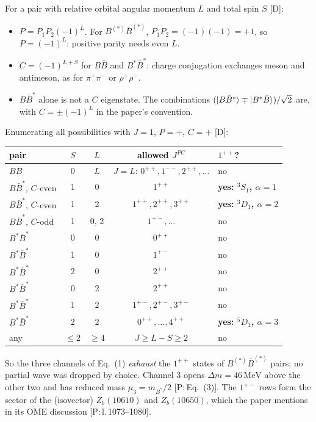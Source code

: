 \documentclass[11pt,a4paper]{article}
\newcommand{\tagP}[1]{\textcolor{blue!65!black}{\textsf{\small[P:\,#1]}}}
\newcommand{\tagD}{\textcolor{orange!85!black}{\textsf{\small[D]}}}
\newcommand{\MeV}{\,\mathrm{MeV}}
\begin{document}
For a pair with relative orbital angular momentum $L$ and total spin $S$ \tagD:
\begin{itemize}
\item $P=P_1P_2(-1)^L$. For $B^{(*)}\bar B^{(*)}$, $P_1P_2=(-1)(-1)=+1$, so $P=(-1)^L$: positive parity needs even $L$.
\item $C=(-1)^{L+S}$ for $B\bar B$ and $B^*\bar B^*$: charge conjugation exchanges meson and antimeson, as for $\pi^+\pi^-$ or $\rho^+\rho^-$.
\item $B\bar B^*$ alone is not a $C$ eigenstate. The combinations $(\ket{B\bar B^*}\mp\ket{B^*\bar B})/\sqrt2$ are, with $C=\pm(-1)^L$ in the paper's convention.
\end{itemize}
Enumerating all possibilities with $J=1$, $P=+$, $C=+$ \tagD:
\begin{center}
\small
\begin{tabular}{lcccl}
\toprule
pair & $S$ & $L$ & allowed $J^{PC}$ & $1^{++}$?\\
\midrule
$B\bar B$ & 0 & $L$ & $J=L$: $0^{++},1^{--},2^{++},\dots$ & no\\
$B\bar B^*$, $C$-even & 1 & 0 & $1^{++}$ & \textbf{yes: $^3S_1$, $\alpha=1$}\\
$B\bar B^*$, $C$-even & 1 & 2 & $1^{++},2^{++},3^{++}$ & \textbf{yes: $^3D_1$, $\alpha=2$}\\
$B\bar B^*$, $C$-odd & 1 & 0, 2 & $1^{+-},\dots$ & no\\
$B^*\bar B^*$ & 0 & 0 & $0^{++}$ & no\\
$B^*\bar B^*$ & 1 & 0 & $1^{+-}$ & no\\
$B^*\bar B^*$ & 2 & 0 & $2^{++}$ & no\\
$B^*\bar B^*$ & 0 & 2 & $2^{++}$ & no\\
$B^*\bar B^*$ & 1 & 2 & $1^{+-},2^{+-},3^{+-}$ & no\\
$B^*\bar B^*$ & 2 & 2 & $0^{++},\dots,4^{++}$ & \textbf{yes: $^5D_1$, $\alpha=3$}\\
any & $\le2$ & $\ge4$ & $J\ge L-S\ge2$ & no\\
\bottomrule
\end{tabular}
\end{center}
So the three channels of Eq.~(1) \emph{exhaust} the $1^{++}$ states of $B^{(*)}\bar B^{(*)}$ pairs; no partial wave was dropped by choice. Channel 3 opens $\Delta m=46\MeV$ above the other two and has reduced mass $\mu_3=m_{B^*}/2$ \tagP{Eq.~(3)}. The $1^{+-}$ rows form the sector of the (isovector) $Z_b(10610)$ and $Z_b(10650)$, which the paper mentions in its OME discussion \tagP{l.\,1073--1080}.
\end{document}
